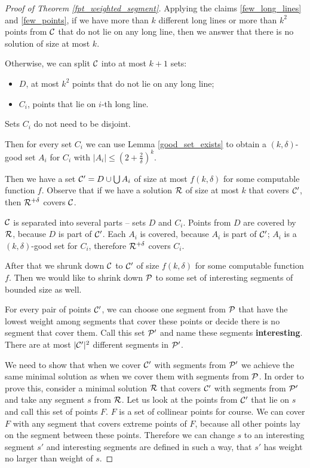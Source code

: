 \begin{proof}[Proof of Theorem \ref{fpt_weighted_segment}]

Applying the claims \ref{few_long_lines} and \ref{few_points},
if we have more than $k$ different long lines
or more than $k^2$ points from $\mathcal{C}$
that do not lie on any long line, then we answer that
there is no solution of size at most $k$.

Otherwise, we can split $\mathcal{C}$ into at most $k+1$ sets:
\begin{itemize}
\item $D$, at most $k^2$ points that do not lie on any long line;
\item $C_i$, points that lie on $i$-th long line.
\end{itemize}
Sets $C_i$ do not need to be disjoint.

Then for every set $C_i$ we can use Lemma \ref{good_set_exists}
to obtain a $(k,\delta)$-good set $A_i$
for $C_i$ with $|A_i| \le (2+\frac{2}{\delta})^k$.

Then we have a set $\mathcal{C}' = D \cup \bigcup A_i$ of size at most $f(k, \delta)$
for some computable function $f$.
Observe that if we have a solution $\mathcal{R}$ of size at most $k$
that covers $\mathcal{C}'$, then $\mathcal{R}^{+\delta}$ covers $\mathcal{C}$.

$\mathcal{C}$ is separated into several parts -- sets $D$ and $C_i$.
Points from $D$ are covered by $\mathcal{R}$, because $D$ is part of $\mathcal{C}'$.
Each $A_i$ is covered, because $A_i$ is part of $\mathcal{C}'$;
$A_i$ is a $(k,\delta)$-good set for $C_i$, therefore $\mathcal{R}^{+\delta}$ covers $C_i$.

After that we shrunk down $\mathcal{C}$ to $\mathcal{C}'$ of size $f(k, \delta)$
for some computable function $f$.
Then we would like to shrink down $\mathcal{P}$ to some set of
interesting segments of bounded size as well.

For every pair of points $\mathcal{C}'$, we can choose one segment from
$\mathcal{P}$ that have the lowest weight
among segments that cover these points 
or decide there is no segment that cover them.
Call this set $\mathcal{P}'$ and name these segments \textbf{interesting}.
There are at most $|\mathcal{C}'|^2$ different segments in $\mathcal{P}'$.

We need to show that when we cover $\mathcal{C}'$
with segments from $\mathcal{P}'$ we achieve the same minimal
solution as when we cover them with segments from $\mathcal{P}$. 
In order to prove this,
consider a minimal solution $\mathcal{R}$ that covers $\mathcal{C}'$
with segments from $\mathcal{P}'$
and take any segment $s$ from $\mathcal{R}$.
Let us look at the points from $\mathcal{C}'$ that lie on $s$
and call this set of points $F$.
$F$ is a set of collinear points for course.
We can cover $F$ with any segment that covers extreme points of $F$,
because all other points lay on the segment between these points.
Therefore we can change $s$ to an interesting segment $s'$
and interesting segments are defined in such a way, that $s'$
has weight no larger than weight of $s$.


\end{proof}
